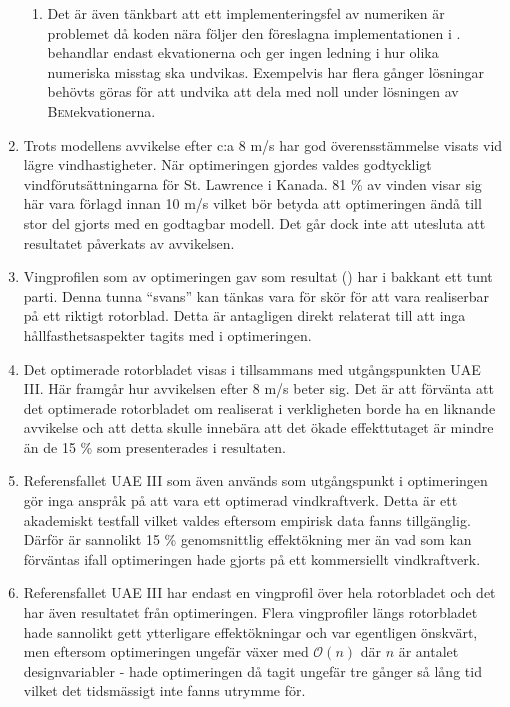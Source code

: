 \begin{enumerate}
\begin{enumerate}
        \item Det är även tänkbart att ett implementeringsfel av numeriken är problemet då koden nära följer den föreslagna implementationen i \citet{hansen}. \citet{hansen} behandlar endast ekvationerna och ger ingen ledning i hur olika numeriska misstag ska undvikas. Exempelvis har flera gånger lösningar behövts göras för att undvika att dela med noll under lösningen av \textsc{Bem}ekvationerna. 
        \end{enumerate}
    
    \item Trots modellens avvikelse efter c:a 8 m/s har god överensstämmelse visats vid lägre vindhastigheter. När optimeringen gjordes valdes godtyckligt vindförutsättningarna för St. Lawrence i Kanada. 81 \% av vinden visar sig här vara förlagd innan 10 m/s vilket bör betyda att optimeringen ändå till stor del gjorts med en godtagbar modell. Det går dock inte att utesluta att resultatet påverkats av avvikelsen.
    
    \item Vingprofilen som av optimeringen gav som resultat () har i bakkant ett tunt parti. Denna tunna ``svans'' kan tänkas vara för skör för att vara realiserbar på ett riktigt rotorblad. Detta är antagligen direkt relaterat till att inga hållfasthetsaspekter tagits med i optimeringen.
    
    \item Det optimerade rotorbladet visas i  tillsammans med utgångspunkten UAE III. Här framgår hur avvikelsen efter 8 m/s beter sig. Det är att förvänta att det optimerade rotorbladet om realiserat i verkligheten borde ha en liknande avvikelse och att detta skulle innebära att det ökade effekttutaget är mindre än de 15 \% som presenterades i resultaten.
      
      
    \item Referensfallet UAE III som även används som utgångspunkt i optimeringen gör inga anspråk på att vara ett optimerad vindkraftverk. Detta är ett akademiskt testfall vilket valdes eftersom empirisk data fanns tillgänglig. Därför är sannolikt 15 \% genomsnittlig effektökning mer än vad som kan förväntas ifall optimeringen hade gjorts på ett kommersiellt vindkraftverk.

    \item Referensfallet UAE III har endast en vingprofil över hela rotorbladet och det har även resultatet från optimeringen. Flera vingprofiler längs rotorbladet hade sannolikt gett ytterligare effektökningar och var egentligen önskvärt, men eftersom optimeringen ungefär växer med $\mathcal{O}\left(n\right)$ där $n$ är antalet designvariabler - hade optimeringen då tagit ungefär tre gånger så lång tid vilket det tidsmässigt inte fanns utrymme för.
    


\end{enumerate}



